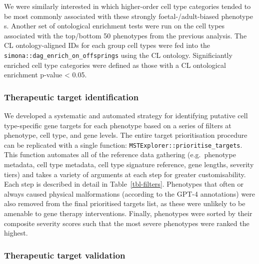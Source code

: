 \documentclass[
]{article}
\begin{document}
We were similarly interested in which higher-order cell type categories
tended to be most commonly associated with these strongly
foetal-/adult-biased phenotype s. Another set of ontological enrichment
tests were run on the cell types associated with the top/bottom 50
phenotypes from the previous analysis. The CL ontology-aligned IDs for
each group cell types were fed into the
\texttt{simona::dag\_enrich\_on\_offsprings} using the CL ontology.
Significiantly enriched cell type categories were defined as those with
a CL ontological enrichment p-value \textless{} 0.05.

\subsubsection{Therapeutic target
identification}\label{therapeutic-target-identification-1}

We developed a systematic and automated strategy for identifying
putative cell type-specific gene targets for each phenotype based on a
series of filters at phenotype, cell type, and gene levels. The entire
target prioritisation procedure can be replicated with a single
function: \texttt{MSTExplorer::prioritise\_targets}. This function
automates all of the reference data gathering (e.g.~phenotype metadata,
cell type metadata, cell type signature reference, gene lengths,
severity tiers) and takes a variety of arguments at each step for
greater customisability. Each step is described in detail in
Table~\ref{tbl-filters}. Phenotypes that often or always caused physical
malformations (according to the GPT-4 annotations) were also removed
from the final prioritised targets list, as these were unlikely to be
amenable to gene therapy interventions. Finally, phenotypes were sorted
by their composite severity scores such that the most severe phenotypes
were ranked the highest.

\subsubsection{Therapeutic target
validation}\label{therapeutic-target-validation-1}
\end{document}
